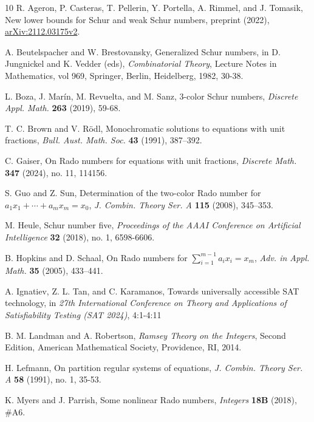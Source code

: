 \documentclass[11pt]{article}
\theoremstyle{definition}
\begin{document}
\begin{thebibliography}{10}
 R. Ageron, P. Casteras, T. Pellerin, Y. Portella, A. Rimmel, and J. Tomasik, New lower bounds for Schur and weak Schur numbers, preprint (2022), \url{arXiv:2112.03175v2}.

 A. Beutelspacher and W. Brestovansky, Generalized Schur numbers, in D. Jungnickel and K. Vedder (eds), \textit{Combinatorial Theory}, Lecture Notes in Mathematics, vol 969, Springer, Berlin, Heidelberg, 1982, 30-38.

 L. Boza, J. Mar\'{i}n, M. Revuelta, and M. Sanz, 3-color Schur numbers, \textit{Discrete Appl. Math.} \textbf{263} (2019), 59-68.

 T. C. Brown and V. R\"{o}dl, Monochromatic solutions to equations with unit fractions, \textit{Bull. Aust. Math. Soc.} \textbf{43} (1991), 387–392. 

 C. Gaiser, On Rado numbers for equations with unit fractions, \textit{Discrete Math.} \textbf{347} (2024), no. 11, 114156.

 S. Guo and Z. Sun, Determination of the two-color Rado number for $a_1x_1+\cdots+a_mx_m=x_0$, \textit{J. Combin. Theory Ser. A } \textbf{115} (2008), 345–353.

 M. Heule, Schur number five, \textit{Proceedings of the AAAI Conference on Artificial Intelligence} \textbf{32} (2018), no. 1, 6598-6606.

 B. Hopkins and D. Schaal, On Rado numbers for $\sum_{i=1}^{m-1}a_ix_i=x_m$, \textit{Adv. in Appl. Math.} \textbf{35} (2005), 433–441.

 A. Ignatiev, Z. L. Tan, and C. Karamanos, Towards universally accessible SAT technology, in \textit{27th International Conference on Theory and Applications of Satisfiability Testing (SAT 2024)}, 4:1-4:11

 B. M. Landman and A. Robertson, \textit{Ramsey Theory on the Integers}, Second Edition, American Mathematical Society, Providence, RI, 2014.

 H. Lefmann, On partition regular systems of equations, \textit{J. Combin. Theory Ser. A} \textbf{58} (1991), no. 1, 35-53.

 K. Myers and J. Parrish, Some nonlinear Rado numbers, \textit{Integers} \textbf{18B} (2018), \#A6.


\end{thebibliography}
\end{document}
